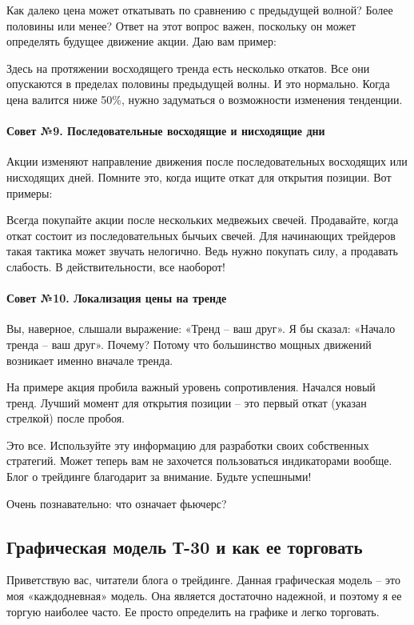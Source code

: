 \documentclass{book}
\begin{document}
Как далеко цена может откатывать по сравнению с предыдущей волной? Более половины или менее? Ответ на этот вопрос важен, поскольку он может определять будущее движение акции. Даю вам пример:

Здесь на протяжении восходящего тренда есть несколько откатов. Все они опускаются в пределах половины предыдущей волны. И это нормально. Когда цена валится ниже 50\%, нужно задуматься о возможности изменения тенденции.

\paragraph{Совет №9. Последовательные восходящие и нисходящие дни}

Акции изменяют направление движения после последовательных восходящих или нисходящих дней. Помните это, когда ищите откат для открытия позиции. Вот примеры:

Всегда покупайте акции после нескольких медвежьих свечей. Продавайте,
когда откат состоит из последовательных бычьих свечей. Для начинающих
трейдеров такая тактика может звучать нелогично. Ведь нужно покупать
силу, а продавать слабость. В действительности, все наоборот!

\paragraph{Совет №10. Локализация цены на тренде}

Вы, наверное, слышали выражение: «Тренд – ваш друг». Я бы сказал: «Начало тренда – ваш друг». Почему? Потому что большинство мощных движений возникает именно вначале тренда.

На примере акция пробила важный уровень сопротивления. Начался новый тренд. Лучший момент для открытия позиции – это первый откат (указан стрелкой) после пробоя.

Это все. Используйте эту информацию для разработки своих собственных стратегий. Может теперь вам не захочется пользоваться индикаторами вообще. Блог о трейдинге благодарит за внимание. Будьте успешными!


Очень познавательно: что означает фьючерс?

\subsection{Графическая модель Т-30 и как ее торговать}

Приветствую вас, читатели блога о трейдинге. Данная графическая модель
– это моя «каждодневная» модель. Она является достаточно надежной, и
поэтому я ее торгую наиболее часто. Ее просто определить на графике и
легко торговать.
\end{document}
